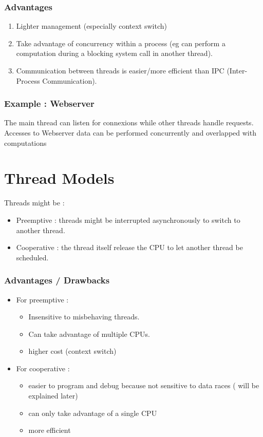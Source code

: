 \subsubsection*{Advantages}
\begin{enumerate}[label=-]
	\item Lighter management (especially context switch)
	\item Take advantage of concurrency within a process (eg can perform a computation during a blocking system call in another thread).
	\item Communication between threads is easier/more efficient than IPC (Inter-Process Communication).
\end{enumerate}

\subsubsection*{Example : Webserver}
The main thread can listen for connexions while other threads handle requests.
Accesses to Webserver data can be performed concurrently and overlapped with computations

\section{Thread Models}

Threads might be :
\begin{itemize}
\item Preemptive : threads might be interrupted asynchronously to switch to another thread. 
\item Cooperative : the thread itself release the CPU to let another thread be scheduled.
\end{itemize}

\subsubsection*{Advantages / Drawbacks}

\begin{itemize}
 \item For preemptive :
\begin{itemize} 
\item Insensitive to misbehaving threads.
\item Can take advantage of multiple CPUs.
\item higher cost (context switch) 
\end{itemize}

\item For cooperative :
 \begin{itemize}
 
\item easier to program and debug  because not sensitive to data races ( will be explained later) 
\item can only take advantage of a single CPU 
\item more efficient
\end{itemize}
\end{itemize}


